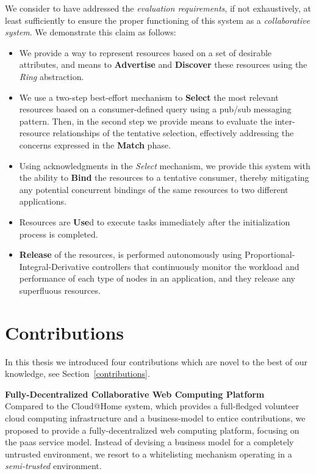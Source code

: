 \documentclass[12pt, titlepage]{uo_temp}
\begin{document}
     We consider to have addressed the \emph{evaluation requirements}, if not
     exhaustively, at least sufficiently to ensure the proper functioning of this system
     as a \emph{collaborative system}. We demonstrate this claim as follows:
     \begin{itemize}
       \item We provide a way to represent resources based on a set of desirable
         attributes, and means to \textbf{Advertise} and \textbf{Discover} these resources
         using the \emph{Ring} abstraction.
       \item We use a two-step best-effort mechanism to \textbf{Select} the most relevant
         resources based on a consumer-defined query using a pub/sub messaging pattern.
         Then, in the second step we provide means to evaluate the inter-resource
         relationships of the tentative selection, effectively addressing the concerns
         expressed in the \textbf{Match} phase.
       \item Using acknowledgments in the \emph{Select} mechanism, we provide this system
         with the ability to \textbf{Bind} the resources to a tentative consumer, thereby
         mitigating any potential concurrent bindings of the same resources to two different
         applications.
       \item Resources are \textbf{Use}d to execute tasks immediately after the
         initialization process is completed.
       \item \textbf{Release} of the resources, is performed autonomously using
         Proportional-Integral-Derivative controllers that continuously monitor the
         workload and performance of each type of nodes in an application, and they
         release any superfluous resources.
     \end{itemize}

     \section{Contributions}
     In this thesis we introduced four contributions which are novel to the best of our
     knowledge, see Section~\ref{contributions}.

     \textbf{Fully-Decentralized Collaborative Web Computing Platform}\\
     Compared to the Cloud@Home system, which provides a full-fledged volunteer cloud
     computing infrastructure and a business-model to entice contributions, we proposed to
     provide a fully-decentralized web computing platform, focusing on the \gls{paas}
     service model. Instead of devising a business model for a completely untrusted
     environment, we resort to a whitelisting mechanism operating in a \emph{semi-trusted}
     environment.
\end{document}
